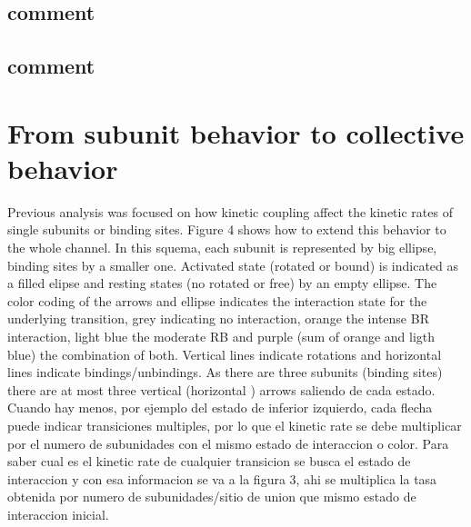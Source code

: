 \documentclass[a4paper,12pt]{article}
\begin{document}
		\newpage
		
		
	
	
	\subsection{comment}
		
		
		
		
	
	\subsection{comment}
		
		\section{From subunit behavior to collective behavior}
		
		Previous analysis was focused on how kinetic coupling affect the kinetic rates of single subunits or binding sites. Figure 4 shows how to extend this behavior to the whole channel. In this squema, each subunit is represented by big ellipse, binding sites by a smaller one. Activated state (rotated or bound) is indicated as a filled elipse and resting states (no rotated or free) by an empty ellipse. The color coding of the arrows and ellipse indicates the interaction state for the underlying transition, grey indicating no interaction, orange the intense BR interaction, light blue the moderate RB and purple (sum of orange and ligth blue) the combination of both.  Vertical lines indicate rotations and horizontal lines indicate bindings/unbindings. As there are three subunits (binding sites) there are at most three vertical (horizontal ) arrows saliendo de cada estado. Cuando hay menos, por ejemplo del estado de inferior izquierdo, cada flecha puede indicar transiciones multiples, por lo que el kinetic rate se debe multiplicar por el numero de subunidades con el mismo estado de interaccion o color. 
		Para saber cual es el kinetic rate de cualquier transicion se busca el estado de interaccion y con esa informacion se va a la figura 3, ahi se multiplica la tasa obtenida por numero de subunidades/sitio de union que  mismo estado de interaccion 
		inicial. 
		
\end{document}
